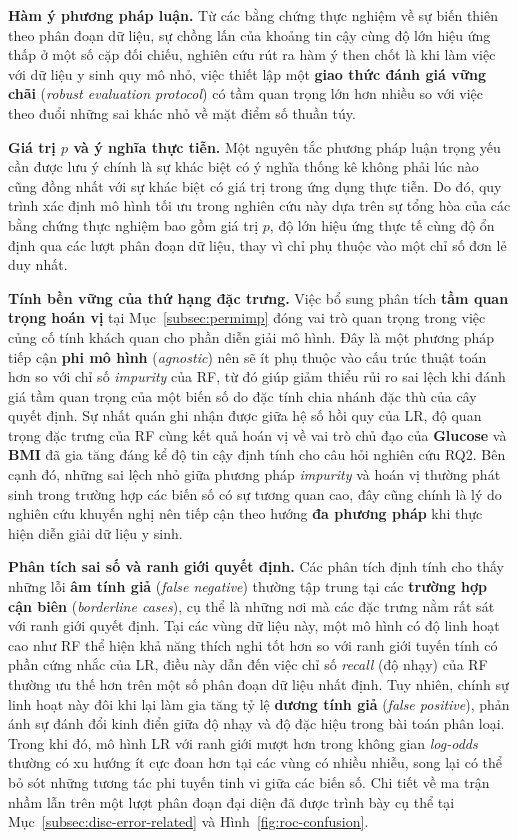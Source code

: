 \documentclass[14pt,a4paper]{extreport}
\begin{document}
\textbf{Hàm ý phương pháp luận.} Từ các bằng chứng thực nghiệm về sự biến thiên theo phân đoạn dữ liệu, sự chồng lấn của khoảng tin cậy cùng độ lớn hiệu ứng thấp ở một số cặp đối chiếu, nghiên cứu rút ra hàm ý then chốt là khi làm việc với dữ liệu y sinh quy mô nhỏ, việc thiết lập một \textbf{giao thức đánh giá vững chãi} (\textit{robust evaluation protocol}) có tầm quan trọng lớn hơn nhiều so với việc theo đuổi những sai khác nhỏ về mặt điểm số thuần túy.

\textbf{Giá trị $p$ và ý nghĩa thực tiễn.} Một nguyên tắc phương pháp luận trọng yếu cần được lưu ý chính là sự khác biệt có ý nghĩa thống kê không phải lúc nào cũng đồng nhất với sự khác biệt có giá trị trong ứng dụng thực tiễn. Do đó, quy trình xác định mô hình tối ưu trong nghiên cứu này dựa trên sự tổng hòa của các bằng chứng thực nghiệm bao gồm giá trị $p$, độ lớn hiệu ứng thực tế cùng độ ổn định qua các lượt phân đoạn dữ liệu, thay vì chỉ phụ thuộc vào một chỉ số đơn lẻ duy nhất.

\textbf{Tính bền vững của thứ hạng đặc trưng.} Việc bổ sung phân tích \textbf{tầm quan trọng hoán vị} tại Mục~\ref{subsec:permimp} đóng vai trò quan trọng trong việc củng cố tính khách quan cho phần diễn giải mô hình. Đây là một phương pháp tiếp cận \textbf{phi mô hình} (\textit{agnostic}) nên sẽ ít phụ thuộc vào cấu trúc thuật toán hơn so với chỉ số \textit{impurity} của RF, từ đó giúp giảm thiểu rủi ro sai lệch khi đánh giá tầm quan trọng của một biến số do đặc tính chia nhánh đặc thù của cây quyết định. Sự nhất quán ghi nhận được giữa hệ số hồi quy của LR, độ quan trọng đặc trưng của RF cùng kết quả hoán vị về vai trò chủ đạo của \textbf{Glucose} và \textbf{BMI} đã gia tăng đáng kể độ tin cậy định tính cho câu hỏi nghiên cứu RQ2. Bên cạnh đó, những sai lệch nhỏ giữa phương pháp \textit{impurity} và hoán vị thường phát sinh trong trường hợp các biến số có sự tương quan cao, đây cũng chính là lý do nghiên cứu khuyến nghị nên tiếp cận theo hướng \textbf{đa phương pháp} khi thực hiện diễn giải dữ liệu y sinh.

\textbf{Phân tích sai số và ranh giới quyết định.} Các phân tích định tính cho thấy những lỗi \textbf{âm tính giả} (\textit{false negative}) thường tập trung tại các \textbf{trường hợp cận biên} (\textit{borderline cases}), cụ thể là những nơi mà các đặc trưng nằm rất sát với ranh giới quyết định. Tại các vùng dữ liệu này, một mô hình có độ linh hoạt cao như RF thể hiện khả năng thích nghi tốt hơn so với ranh giới tuyến tính có phần cứng nhắc của LR, điều này dẫn đến việc chỉ số \textit{recall} (độ nhạy) của RF thường ưu thế hơn trên một số phân đoạn dữ liệu nhất định. Tuy nhiên, chính sự linh hoạt này đôi khi lại làm gia tăng tỷ lệ \textbf{dương tính giả} (\textit{false positive}), phản ánh sự đánh đổi kinh điển giữa độ nhạy và độ đặc hiệu trong bài toán phân loại. Trong khi đó, mô hình LR với ranh giới mượt hơn trong không gian \textit{log-odds} thường có xu hướng ít cực đoan hơn tại các vùng có nhiều nhiễu, song lại có thể bỏ sót những tương tác phi tuyến tinh vi giữa các biến số. Chi tiết về ma trận nhầm lẫn trên một lượt phân đoạn đại diện đã được trình bày cụ thể tại Mục~\ref{subsec:disc-error-related} và Hình~\ref{fig:roc-confusion}.
\end{document}
